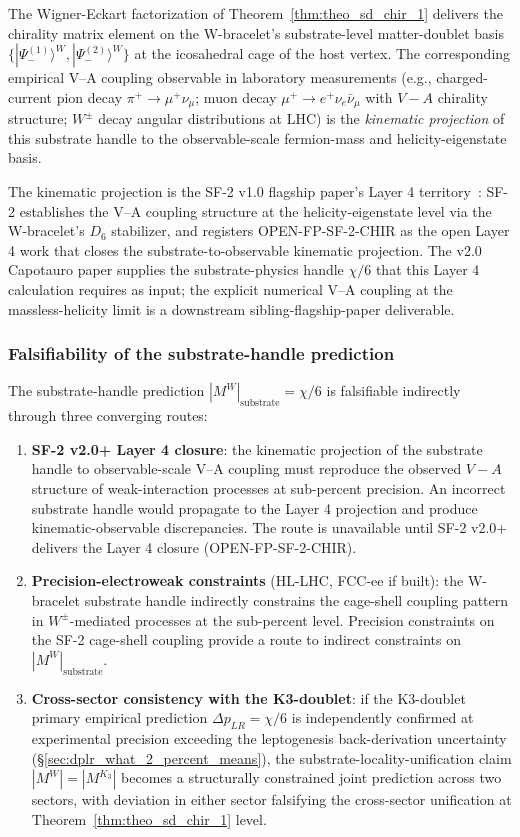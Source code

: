 \documentclass[11pt,letterpaper]{article}
\newcommand{\Kthree}{\ensuremath{K_3}}
\newcommand{\DeltapLR}{\Delta p_{LR}}
\newcommand{\PsiminusOne}{|\Psi_-^{(1)}\rangle}
\newcommand{\PsiminusTwo}{|\Psi_-^{(2)}\rangle}
\newcommand{\Dsix}{D_6}
\begin{document}
The Wigner-Eckart factorization of Theorem~\ref{thm:theo_sd_chir_1} delivers the chirality matrix element on the W-bracelet's substrate-level matter-doublet basis $\{\PsiminusOne^W, \PsiminusTwo^W\}$ at the icosahedral cage of the host vertex. The corresponding empirical V--A coupling observable in laboratory measurements (e.g., charged-current pion decay $\pi^+ \to \mu^+ \nu_\mu$; muon decay $\mu^+ \to e^+ \nu_e \bar{\nu}_\mu$ with $V{-}A$ chirality structure; $W^\pm$ decay angular distributions at LHC) is the \emph{kinematic projection} of this substrate handle to the observable-scale fermion-mass and helicity-eigenstate basis.

The kinematic projection is the SF-2 v1.0 flagship paper's Layer 4 territory~\cite{abshier_sf2}: SF-2 establishes the V--A coupling structure at the helicity-eigenstate level via the W-bracelet's $\Dsix$ stabilizer, and registers OPEN-FP-SF-2-CHIR as the open Layer 4 work that closes the substrate-to-observable kinematic projection. The v2.0 Capotauro paper supplies the substrate-physics handle $\chi/6$ that this Layer 4 calculation requires as input; the explicit numerical V--A coupling at the massless-helicity limit is a downstream sibling-flagship-paper deliverable.

\subsubsection{Falsifiability of the substrate-handle prediction}\label{sec:w_falsifiability}

The substrate-handle prediction $|M^W|_{\text{substrate}} = \chi/6$ is falsifiable indirectly through three converging routes:

\begin{enumerate}\setlength\itemsep{0.3em}
    \item \textbf{SF-2 v2.0+ Layer 4 closure}: the kinematic projection of the substrate handle to observable-scale V--A coupling must reproduce the observed $V{-}A$ structure of weak-interaction processes at sub-percent precision. An incorrect substrate handle would propagate to the Layer 4 projection and produce kinematic-observable discrepancies. The route is unavailable until SF-2 v2.0+ delivers the Layer 4 closure (OPEN-FP-SF-2-CHIR).
    \item \textbf{Precision-electroweak constraints} (HL-LHC, FCC-ee if built): the W-bracelet substrate handle indirectly constrains the cage-shell coupling pattern in $W^\pm$-mediated processes at the sub-percent level. Precision constraints on the SF-2 cage-shell coupling provide a route to indirect constraints on $|M^W|_{\text{substrate}}$.
    \item \textbf{Cross-sector consistency with the K3-doublet}: if the K3-doublet primary empirical prediction $\DeltapLR = \chi/6$ is independently confirmed at experimental precision exceeding the leptogenesis back-derivation uncertainty (\S\ref{sec:dplr_what_2_percent_means}), the substrate-locality-unification claim $|M^W| = |M^{\Kthree}|$ becomes a structurally constrained joint prediction across two sectors, with deviation in either sector falsifying the cross-sector unification at Theorem~\ref{thm:theo_sd_chir_1} level.
\end{enumerate}
\end{document}
